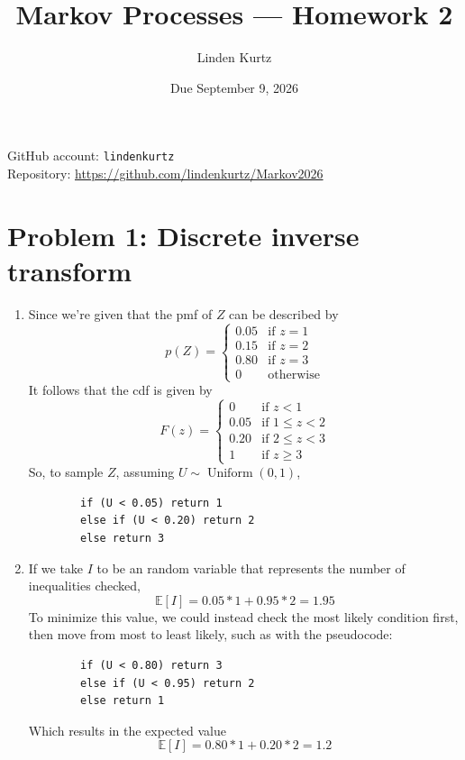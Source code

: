 \documentclass[11pt]{article}
\title{Markov Processes --- Homework 2}
\author{Linden Kurtz}
\date{Due September 9, 2026}
\begin{document}
\maketitle

\noindent
GitHub account: \texttt{lindenkurtz} \\
Repository: \url{https://github.com/lindenkurtz/Markov2026}

\section*{Problem 1: Discrete inverse transform}

\begin{enumerate}[label=(\alph*)]
    \item
    Since we're given that the pmf of $Z$ can be described by
    \[
        p(Z) = \begin{cases}
            0.05 & \text{if } z = 1 \\
            0.15 & \text{if } z = 2 \\
            0.80 & \text{if } z = 3 \\
            0    & \text{otherwise}
        \end{cases}
    \]
    It follows that the cdf is given by
    \[
        F(z) = \begin{cases}
            0    & \text{if } z < 1 \\
            0.05 & \text{if } 1 \le z < 2 \\
            0.20 & \text{if } 2 \le z < 3 \\
            1    & \text{if } z \ge 3
        \end{cases}
    \]
    So, to sample $Z$, assuming $U \sim \operatorname{Uniform}(0, 1)$,
    \begin{verbatim}
        if (U < 0.05) return 1
        else if (U < 0.20) return 2
        else return 3
    \end{verbatim}

    \item 
    If we take $I$ to be an random variable that represents the number of inequalities checked,
    \[
        \mathbb{E}[I] = 0.05*1 + 0.95*2 = 1.95
    \]
    To minimize this value, we could instead check the most likely condition first, then move from most to least likely, such as with the pseudocode:
    \begin{verbatim}
        if (U < 0.80) return 3
        else if (U < 0.95) return 2
        else return 1
    \end{verbatim}
    Which results in the expected value
    \[
        \mathbb{E}[I] = 0.80*1 + 0.20*2 = 1.2
    \]


\end{enumerate}
\end{document}
